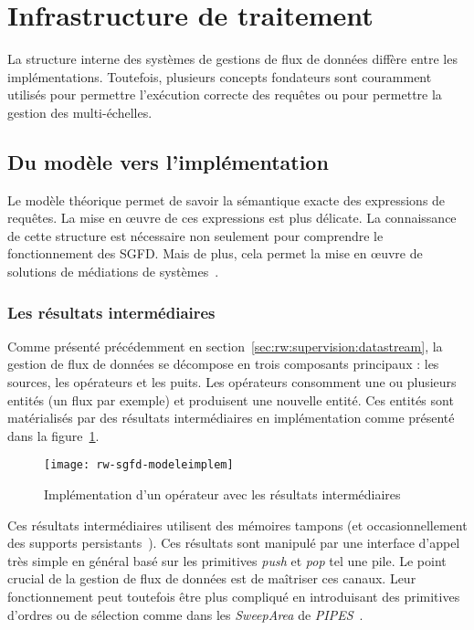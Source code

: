 \section{Infrastructure de traitement}
La structure interne des systèmes de gestions de flux de données diffère entre les implémentations. Toutefois, plusieurs concepts fondateurs sont couramment utilisés pour permettre l'exécution correcte des requêtes ou pour permettre la gestion des multi-échelles.
\subsection{Du modèle vers l'implémentation}
Le modèle théorique permet de savoir la sémantique exacte des expressions de requêtes. La mise en œuvre de ces expressions est plus délicate. La connaissance de cette structure est nécessaire non seulement pour comprendre le fonctionnement des SGFD. Mais de plus, cela permet la mise en œuvre de solutions de médiations de systèmes~\cite{Tatbul:integration}.

\subsubsection{Les résultats intermédiaires}
Comme présenté précédemment en section~\ref{sec:rw:supervision:datastream}, la gestion de flux de données se décompose en trois composants principaux : les sources, les opérateurs et les puits. Les opérateurs consomment une ou plusieurs entités (un flux par exemple) et produisent une nouvelle entité. Ces entités sont matérialisés par des résultats intermédiaires en implémentation comme présenté dans la figure~\ref{fig:rw:sgfd:modeleimplem}.
\begin{figure}
    \centering
    \texttt{[image: rw-sgfd-modeleimplem]}
    \caption{Implémentation d'un opérateur avec les résultats intermédiaires}\label{fig:rw:sgfd:modeleimplem}
\end{figure}

Ces résultats intermédiaires utilisent des mémoires tampons (et occasionnellement des supports persistants~\cite{Abadi:aurora}). Ces résultats sont manipulé par une interface d'appel très simple en général basé sur les primitives \textit{push} et \textit{pop} tel une pile. Le point crucial de la gestion de flux de données est de maîtriser ces canaux. Leur fonctionnement peut toutefois être plus compliqué en introduisant des primitives d'ordres ou de sélection comme dans les \textit{SweepArea} de \textit{PIPES}~\cite{Kramer:semantics}.


